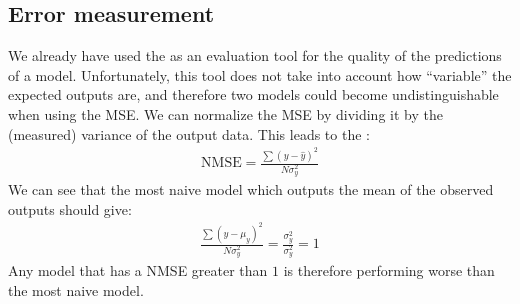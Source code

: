\documentclass[letterpaper,10pt,english]{jupyterBook}
\begin{document}
\subsection{Error measurement}
\label{\detokenize{05:error-measurement}}
\sphinxAtStartPar
We already have used the  as an evaluation tool for the quality of the predictions of a model. Unfortunately, this tool does not take into account how “variable” the expected outputs are, and therefore two models could become undistinguishable when using the MSE. We can normalize the MSE by dividing it by the (measured) variance of the output data. This leads to the :
\begin{equation*}
\begin{split}\text{NMSE} = \frac{\sum(y-\hat{y})^2}{N\sigma^2_y}\end{split}
\end{equation*}
\sphinxAtStartPar
We can see that the most naive model which outputs the mean of the observed outputs should give:
\begin{equation*}
\begin{split}\frac{\sum(y-\mu_y)^2}{N\sigma^2_y} = \frac{\sigma^2_y}{\sigma^2_y} = 1\end{split}
\end{equation*}
\sphinxAtStartPar
Any model that has a NMSE greater than \(1\) is therefore performing worse than the most naive model.
\end{document}
